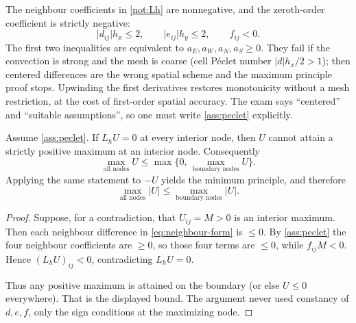 \documentclass[11pt,a4paper]{article}
\begin{document}
\begin{center}
\end{center}

\begin{assumption}
\label{ass:peclet}
The neighbour coefficients in \cref{not:Lh} are nonnegative, and the zeroth-order coefficient is strictly negative:
\[
\lvert d_{ij}\rvert h_x\le 2,
\qquad
\lvert e_{ij}\rvert h_y\le 2,
\qquad
f_{ij}<0.
\]
The first two inequalities are equivalent to \(a_E,a_W,a_N,a_S\ge 0\). They fail if the convection is strong and the mesh is coarse (cell P\'eclet number \(\lvert d\rvert h_x/2>1\)); then centered differences are the wrong spatial scheme and the maximum principle proof stops. Upwinding the first derivatives restores monotonicity without a mesh restriction, at the cost of first-order spatial accuracy. The exam says ``centered'' and ``suitable assumptions'', so one must write \cref{ass:peclet} explicitly.
\end{assumption}

\begin{theorem}
\label{thm:dmp}
Assume \cref{ass:peclet}. If \(L_h U=0\) at every interior node, then \(U\) cannot attain a strictly positive maximum at an interior node. Consequently
\[
\max_{\text{all nodes}}U
\le
\max\bigl\{0,\,\max_{\text{boundary nodes}}U\bigr\}.
\]
Applying the same statement to \(-U\) yields the minimum principle, and therefore
\[
\max_{\text{all nodes}}\lvert U\rvert
\le
\max_{\text{boundary nodes}}\lvert U\rvert.
\]
\end{theorem}

\begin{proof}
Suppose, for a contradiction, that \(U_{ij}=M>0\) is an interior maximum. Then each neighbour difference in \eqref{eq:neighbour-form} is \(\le 0\). By \cref{ass:peclet} the four neighbour coefficients are \(\ge 0\), so those four terms are \(\le 0\), while \(f_{ij}M<0\). Hence \((L_h U)_{ij}<0\), contradicting \(L_h U=0\).

Thus any positive maximum is attained on the boundary (or else \(U\le 0\) everywhere). That is the displayed bound. The argument never used constancy of \(d,e,f\), only the sign conditions at the maximizing node.
\end{proof}
\end{document}
